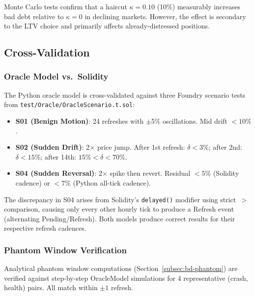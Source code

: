 \documentclass[10pt,a4paper,twocolumn]{article}
\begin{document}
Monte Carlo tests confirm that a haircut $\kappa = 0.10$ (10\%) measurably increases bad debt relative to $\kappa = 0$ in declining markets. However, the effect is secondary to the LTV choice and primarily affects already-distressed positions.

\subsection{Cross-Validation}
\label{sec:bd-validation}

\subsubsection{Oracle Model vs.\ Solidity}
\label{subsec:bd-oracle-validation}

The Python oracle model is cross-validated against three Foundry scenario tests from \texttt{test/Oracle/OracleScenario.t.sol}:

\begin{itemize}[leftmargin=*]
\item \textbf{S01 (Benign Motion)}: 24 refreshes with $\pm$5\% oscillations. Mid drift $< 10\%$. \checkmark
\item \textbf{S02 (Sudden Drift)}: 2$\times$ price jump. After 1st refresh: $\delta < 3\%$; after 2nd: $\delta < 15\%$; after 14th: $15\% < \delta < 70\%$. \checkmark
\item \textbf{S04 (Sudden Reversal)}: 2$\times$ spike then revert. Residual $< 5\%$ (Solidity cadence) or $< 7\%$ (Python all-tick cadence). \checkmark
\end{itemize}

\noindent The discrepancy in S04 arises from Solidity's \texttt{delayed()} modifier using strict~$>$ comparison, causing only every other hourly tick to produce a Refresh event (alternating Pending/Refresh). Both models produce correct results for their respective refresh cadences.

\subsubsection{Phantom Window Verification}
\label{subsec:bd-phantom-validation}

Analytical phantom window computations (Section~\ref{subsec:bd-phantom}) are verified against step-by-step OracleModel simulations for 4 representative (crash, health) pairs. All match within $\pm 1$ refresh.
\end{document}
